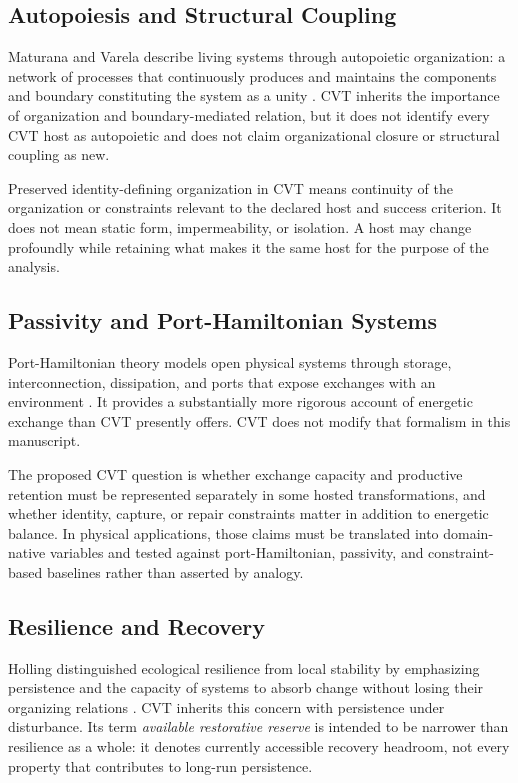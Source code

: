 \documentclass[11pt]{article}
\begin{document}
\subsection{Autopoiesis and Structural Coupling}

Maturana and Varela describe living systems through autopoietic organization: a network of processes that continuously produces and maintains the components and boundary constituting the system as a unity \cite{maturana1980}. CVT inherits the importance of organization and boundary-mediated relation, but it does not identify every CVT host as autopoietic and does not claim organizational closure or structural coupling as new.

Preserved identity-defining organization in CVT means continuity of the organization or constraints relevant to the declared host and success criterion. It does not mean static form, impermeability, or isolation. A host may change profoundly while retaining what makes it the same host for the purpose of the analysis.

\subsection{Passivity and Port-Hamiltonian Systems}

Port-Hamiltonian theory models open physical systems through storage, interconnection, dissipation, and ports that expose exchanges with an environment \cite{vanderschaft2014}. It provides a substantially more rigorous account of energetic exchange than CVT presently offers. CVT does not modify that formalism in this manuscript.

The proposed CVT question is whether exchange capacity and productive retention must be represented separately in some hosted transformations, and whether identity, capture, or repair constraints matter in addition to energetic balance. In physical applications, those claims must be translated into domain-native variables and tested against port-Hamiltonian, passivity, and constraint-based baselines rather than asserted by analogy.

\subsection{Resilience and Recovery}

Holling distinguished ecological resilience from local stability by emphasizing persistence and the capacity of systems to absorb change without losing their organizing relations \cite{holling1973}. CVT inherits this concern with persistence under disturbance. Its term \emph{available restorative reserve} is intended to be narrower than resilience as a whole: it denotes currently accessible recovery headroom, not every property that contributes to long-run persistence.
\end{document}
